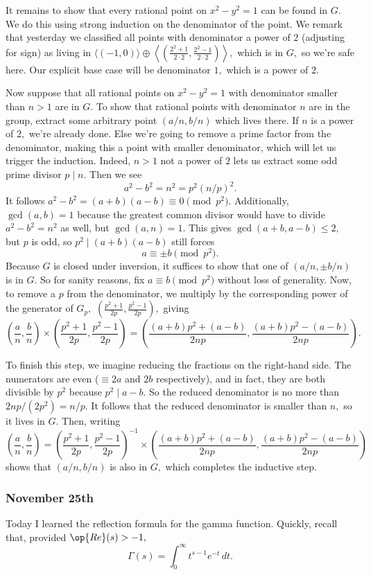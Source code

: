 It remains to show that every rational point on $x^2-y^2=1$ can be found in $G.$ We do this using strong induction on the denominator of the point. We remark that yesterday we classified all points with denominator a power of $2$ (adjusting for sign) as living in $\langle(-1,0)\rangle\oplus\left\langle\left(\frac{2^2+1}{2\cdot2},\frac{2^2-1}{2\cdot2}\right)\right\rangle,$ which is in $G,$ so we're safe here. Our explicit base case will be denominator $1,$ which is a power of $2.$

Now suppose that all rational points on $x^2-y^2=1$ with denominator smaller than $n>1$ are in $G.$ To show that rational points with denominator $n$ are in the group, extract some arbitrary point $(a/n,b/n)$ which lives there. If $n$ is a power of $2,$ we're already done. Else we're going to remove a prime factor from the denominator, making this a point with smaller denominator, which will let us trigger the induction. Indeed, $n>1$ not a power of $2$ lets us extract some odd prime divisor $p\mid n.$ Then we see
\[a^2-b^2=n^2=p^2(n/p)^2.\]
It follows $a^2-b^2=(a+b)(a-b)\equiv0\pmod{p^2}.$ Additionally, $\gcd(a,b)=1$ because the greatest common divisor would have to divide $a^2-b^2=n^2$ as well, but $\gcd(a,n)=1.$ This gives $\gcd(a+b,a-b)\le2,$ but $p$ is odd, so $p^2\mid(a+b)(a-b)$ still forces
\[a\equiv\pm b\pmod{p^2}.\]
Because $G$ is closed under inversion, it suffices to show that one of $(a/n,\pm b/n)$ is in $G.$ So for sanity reasons, fix $a\equiv b\pmod{p^2}$ without loss of generality. Now, to remove a $p$ from the denominator, we multiply by the corresponding power of the generator of $G_p,$ $\left(\frac{p^2+1}{2p},\frac{p^2-1}{2p}\right),$ giving
\[\left(\frac an,\frac bn\right)\times\left(\frac{p^2+1}{2p},\frac{p^2-1}{2p}\right)=\left(\frac{(a+b)p^2+(a-b)}{2np},\frac{(a+b)p^2-(a-b)}{2np}\right).\]

To finish this step, we imagine reducing the fractions on the right-hand side. The numerators are even ($\equiv2a$ and $2b$ respectively), and in fact, they are both divisible by $p^2$ because $p^2\mid a-b.$ So the reduced denominator is no more than $2np/\left(2p^2\right)=n/p.$ It follows that the reduced denominator is smaller than $n,$ so it lives in $G.$ Then, writing
\[\left(\frac an,\frac bn\right)=\left(\frac{p^2+1}{2p},\frac{p^2-1}{2p}\right)^{-1}\times\left(\frac{(a+b)p^2+(a-b)}{2np},\frac{(a+b)p^2-(a-b)}{2np}\right)\]
shows that $(a/n,b/n)$ is also in $G,$ which completes the inductive step.

\subsubsection{November 25th}
Today I learned the reflection formula for the gamma function. Quickly, recall that, provided $\op{Re}(s)>-1,$
\[\Gamma(s)=\int_0^\infty t^{s-1}e^{-t}\,dt.\]

